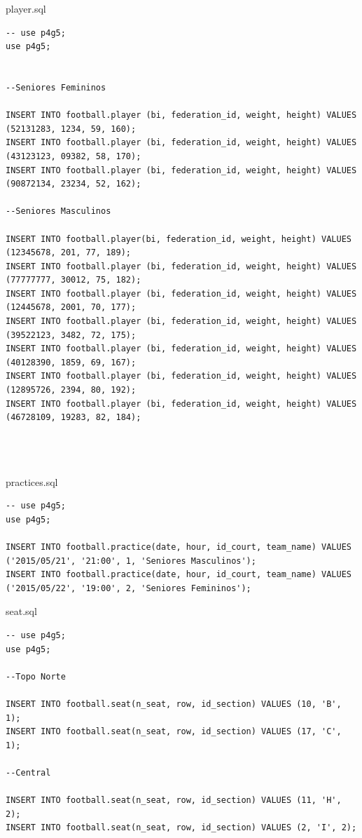 \documentclass[pdftex,12pt,a4paper]{report}
\begin{document}
player.sql
\begin{lstlisting} 
-- use p4g5;
use p4g5;


--Seniores Femininos

INSERT INTO football.player (bi, federation_id, weight, height) VALUES (52131283, 1234, 59, 160);
INSERT INTO football.player (bi, federation_id, weight, height) VALUES (43123123, 09382, 58, 170);
INSERT INTO football.player (bi, federation_id, weight, height) VALUES (90872134, 23234, 52, 162);

--Seniores Masculinos

INSERT INTO football.player(bi, federation_id, weight, height) VALUES (12345678, 201, 77, 189);
INSERT INTO football.player (bi, federation_id, weight, height) VALUES (77777777, 30012, 75, 182);
INSERT INTO football.player (bi, federation_id, weight, height) VALUES (12445678, 2001, 70, 177);
INSERT INTO football.player (bi, federation_id, weight, height) VALUES (39522123, 3482, 72, 175);
INSERT INTO football.player (bi, federation_id, weight, height) VALUES (40128390, 1859, 69, 167);
INSERT INTO football.player (bi, federation_id, weight, height) VALUES (12895726, 2394, 80, 192);
INSERT INTO football.player (bi, federation_id, weight, height) VALUES (46728109, 19283, 82, 184);




\end{lstlisting}

practices.sql
\begin{lstlisting} 
-- use p4g5;
use p4g5;

INSERT INTO football.practice(date, hour, id_court, team_name) VALUES ('2015/05/21', '21:00', 1, 'Seniores Masculinos');
INSERT INTO football.practice(date, hour, id_court, team_name) VALUES ('2015/05/22', '19:00', 2, 'Seniores Femininos');
\end{lstlisting}

seat.sql
\begin{lstlisting} 
-- use p4g5;
use p4g5;

--Topo Norte

INSERT INTO football.seat(n_seat, row, id_section) VALUES (10, 'B', 1);
INSERT INTO football.seat(n_seat, row, id_section) VALUES (17, 'C', 1);

--Central

INSERT INTO football.seat(n_seat, row, id_section) VALUES (11, 'H', 2);
INSERT INTO football.seat(n_seat, row, id_section) VALUES (2, 'I', 2);
\end{lstlisting}
\end{document}
